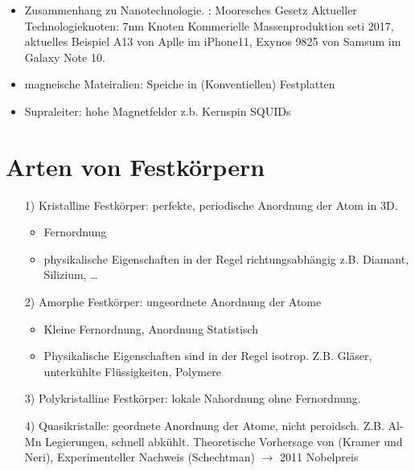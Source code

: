 \begin{itemize}
\begin{itemize}
	        \item Zusammenhang zu Nanotechnologie. : Mooresches Gesetz \newline
	        Aktueller Technologieknoten: 7nm Knoten \newline
	        Kommerielle Massenproduktion seti 2017, aktuelles Beispiel A13 von Aplle im iPhone11, Exynos 9825 von Samsum im Galaxy Note 10.
	        \item magneische Mateiralien: Speiche in (Konventiellen) Festplatten
	        \item Supraleiter: hohe Magnetfelder z.b. Kernspin SQUIDs 
	    \end{itemize}
	\end{itemize}

\section*{Arten von Festkörpern}
\begin{itemize}
    \item[1)] Kristalline Festkörper: perfekte, periodische Anordnung der Atom in 3D.
	    \begin{itemize}
	        \item Fernordnung
	        \item physikalische Eigenschaften in der Regel richtungsabhängig
	        z.B. Diamant, Silizium, \dots
	    \end{itemize} 
    \item[2)] Amorphe Festkörper: ungeordnete Anordnung der Atome
	    \begin{itemize}
	        \item Kleine Fernordnung, Anordnung Statistisch
	        \item Physikalische Eigenschaften sind in der Regel isotrop. Z.B. Gläser, unterkühlte Flüssigkeiten, Polymere
	    \end{itemize}
    \item[3)] Polykristalline Festkörper: lokale Nahordnung ohne Fernordnung.
    \item[4)] Quasikristalle: geordnete Anordnung der Atome, nicht peroidsch. Z.B. Al-Mn Legierungen, schnell abkühlt.  Theoretische Vorhersage von (Kramer und Neri), Experimenteller Nachweis (Schechtman) $\rightarrow$ 2011 Nobelpreis
\end{itemize}









